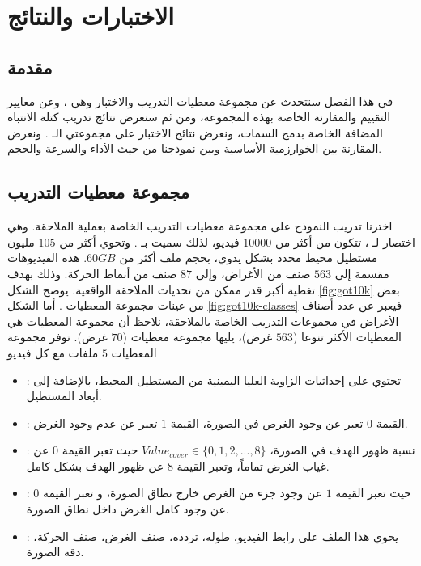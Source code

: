 \chapter{الاختبارات والنتائج}
\section{مقدمة}
في هذا الفصل سنتحدث عن مجموعة معطيات التدريب والاختبار وهي
،
وعن معايير التقييم والمقارنة الخاصة بهذه المجموعة، ومن ثم سنعرض نتائج تدريب كتلة الانتباه المضافة الخاصة بدمج السمات، ونعرض نتائج الاختبار على مجموعتي الـ
.
ونعرض المقارنة بين الخوارزمية الأساسية 
وبين نموذجنا من حيث الأداء والسرعة والحجم.
\section{مجموعة معطيات التدريب 
}
اخترنا تدريب النموذج على مجموعة معطيات التدريب 
الخاصة بعملية الملاحقة.
وهي اختصار لـ
،
تتكون من أكثر من 
$10000$
فيديو، لذلك سميت بـ
.
وتحوي أكثر من 
$105$
مليون مستطيل محيط محدد بشكل يدوي، بحجم ملف أكثر من 
$60GB$.
\newline
هذه الفيديوهات مقسمة إلى 
$563$
صنف من الأغراض، وإلى 
$87$
صنف من أنماط الحركة. وذلك بهدف تغطية أكبر قدر ممكن من تحديات الملاحقة الواقعية.
يوضح الشكل 
\ref{fig:got10k}
بعض من عينات مجموعة المعطيات 
.
\newline
أما الشكل 
\ref{fig:got10k-classes}
فيعبر عن عدد أصناف الأغراض في مجموعات التدريب الخاصة بالملاحقة، نلاحظ أن مجموعة المعطيات
هي المعطيات الأكثر تنوعا ($563$ غرض)، يليها مجموعة معطيات 
($70$ غرض).
\newline
توفر مجموعة المعطيات $5$ ملفات مع كل فيديو
\begin{itemize}
\item {}:
تحتوي على إحداثيات الزاوية العليا اليمينية من المستطيل المحيط، بالإضافة إلى أبعاد المستطيل.
\item {}:
القيمة $0$ تعبر عن وجود الغرض في الصورة، القيمة $1$ تعبر عن عدم وجود الغرض.
\item {}:
نسبة ظهور الهدف في الصورة،
$Value_{cover} \in \{0,1,2,...,8\}$
حيث تعبر القيمة $0$ عن غياب الغرض تماماً، وتعبر القيمة $8$ عن ظهور الهدف بشكل كامل.
\item {}:
حيث تعبر القيمة
$1$ عن وجود جزء من الغرض خارج نطاق الصورة، و تعبر القيمة $0$ عن وجود  كامل الغرض داخل نطاق الصورة.  
\item {}:
يحوي هذا الملف على رابط الفيديو، طوله، تردده، صنف الغرض، صنف الحركة، دقة الصورة.
\end{itemize}

